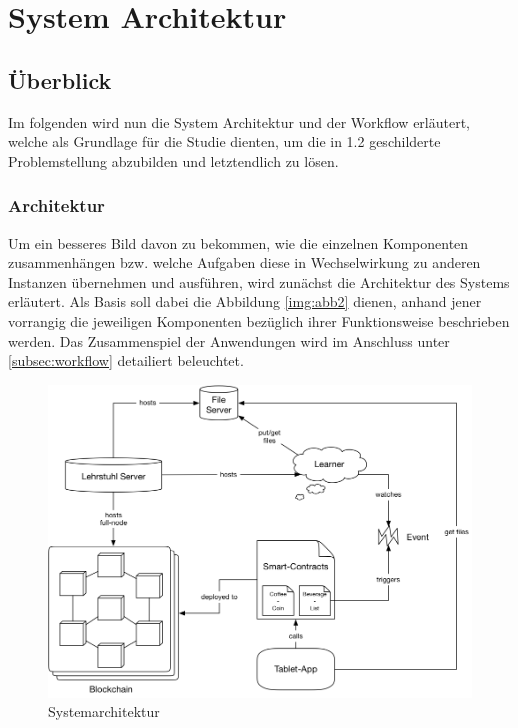 \chapter{System Architektur}
\label{kap:Kapitel03}

\section{Überblick}
Im folgenden wird nun die System Architektur und der Workflow erläutert, welche als Grundlage für die Studie dienten, um die in 1.2 geschilderte Problemstellung abzubilden und letztendlich zu lösen.

\subsection{Architektur}
\label{subsec:architecture}
Um ein besseres Bild davon zu bekommen, wie die einzelnen Komponenten
zusammenhängen bzw. welche Aufgaben diese in Wechselwirkung zu anderen Instanzen übernehmen und ausführen, wird zunächst die Architektur des Systems erläutert. Als Basis soll dabei die Abbildung \ref{img:abb2} dienen, anhand jener vorrangig die jeweiligen Komponenten bezüglich ihrer Funktionsweise beschrieben werden. Das Zusammenspiel der Anwendungen wird im Anschluss unter \ref{subsec:workflow} detailiert beleuchtet.

\clearpage
\newpage

\begin{figure}[th!]
	\centering
	\includegraphics[width=.99\columnwidth]{./Abbildungen/Kapitel_03/system_architecture.png}
	\caption{Systemarchitektur}
	\label{img:abb1}
\end{figure}
\FloatBarrier

